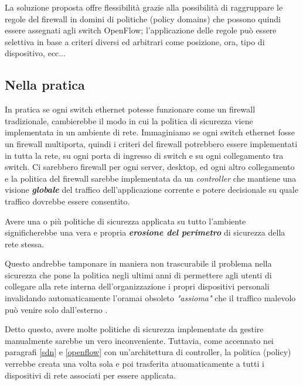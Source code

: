 La soluzione proposta offre flessibilità grazie alla possibilità di raggruppare le regole del firewall in domini di politiche (policy domains) che possono quindi essere assegnati agli switch OpenFlow; l'applicazione delle regole può essere selettiva in base a criteri diversi ed arbitrari come posizione, ora, tipo di dispositivo, ecc...

\subsection{Nella pratica}
In pratica se ogni switch ethernet potesse funzionare come un firewall tradizionale, cambierebbe il modo in cui la politica di sicurezza viene implementata in un ambiente di rete. Immaginiamo se ogni switch ethernet fosse un firewall multiporta, quindi i criteri del firewall potrebbero essere implementati in tutta la rete, su ogni porta di ingresso di switch e su ogni collegamento tra switch. Ci sarebbero firewall per ogni server, desktop, ed ogni altro collegamento e la politica del firewall sarebbe implementata da un \textit{controller} che mantiene una visione \textit{\textbf{globale}} del traffico dell'applicazione corrente e potere decisionale su quale traffico dovrebbe essere consentito.

Avere una o più politiche di sicurezza applicata su tutto l'ambiente significherebbe una vera e propria \textit{\textbf{erosione del perimetro}} \cite{opengroup_erosion} di sicurezza della rete stessa.

Questo andrebbe tamponare in maniera non trascurabile il problema nella sicurezza che pone la politica negli ultimi anni di permettere agli utenti di collegare alla rete interna dell'organizzazione i propri dispositivi personali invalidando automaticamente l'oramai obsoleto \textit{"assioma"} che il traffico malevolo può venire solo dall'esterno \cite{bakker2016network}.

Detto questo, avere molte politiche di sicurezza implementate da gestire manualmente sarebbe un vero inconveniente. Tuttavia, come accennato nei paragrafi \ref{sdn} e \ref{openflow} con un'architettura di controller, la politica (policy) verrebbe creata una volta sola e poi trasferita atuomaticamente a tutti i dispositivi di rete associati per essere applicata.
